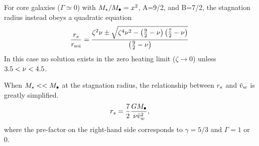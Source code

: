 For core galaxies ($\Gamma \simeq 0$) with $M_{\star}/M_{\bullet}=x^2$, A=9/2,
and B=7/2, the stagnation radius instead obeys a quadratic equation
\begin{align}
\frac{r_s}{r_{\rm soi}}=\frac{\zeta^2 \nu \pm \sqrt{\zeta^4 \nu^2 - \left(\frac{9}{2}-\nu\right)
    \left(\frac{7}{2}-\nu\right)}}{\left(\frac{9}{2}-\nu\right)}
\label{eq:rstag}
\end{align}
In this case no solution exists in the zero heating limit ($\zeta
\rightarrow 0$) unless $3.5<\nu<4.5$.

When $M_{\star} << M_{\bullet}$ at the stagnation radius, the relationship
between $r_s$ and $\tilde{v}_{w}$ is greatly simplified.
\begin{align}
r_s=\frac{7}{2}\frac{G M_{\bullet}}{\nu \tilde{v}_{w}^2},
\end{align}
where the pre-factor on the right-hand side corresponds to
$\gamma=5/3$ and $\Gamma=1$ or 0.  



